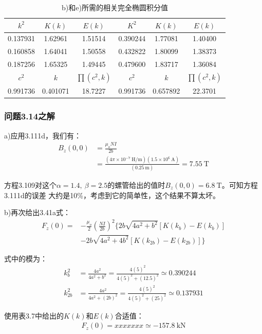 \begin{table}[htbp]\small
\centering
\caption{b)和e)所需的相关完全椭圆积分值}
	\begin{tabular}{|c|c|c||c|c|c|}
		\hline
	$	k^2   $   & $K(k)$     &$ E(k) $   &$ K^2  $   &$ K(k) $    &$ E(k) $   \\ \hline\hline
		0.137931 & 1.62961  & 1.51514 & 0.390244 & 1.77081  & 1.40400 \\ \hline
		0.160858 & 1.64041  & 1.50558 & 0.432822 & 1.80099  & 1.38373 \\ \hline
		0.187256 & 1.65325  & 1.49445 & 0.479600 & 1.83717  & 1.36084 \\ \hline\hline
		$c^2 $     &$ k  $     & $\prod(c^2,k) $& $c^2  $    & $k  $     &$ \prod(c^2,k)$       \\ \hline\hline
		0.991736 & 0.401071 & 18.7227 & 0.991736 & 0.657892 & 22.3701 \\ \hline
	\end{tabular}
\end{table}

\subsubsection{问题3.14之解}
a)应用3.111d，我们有：
\begin{align*}
B_{z}(0,0)&=\frac{\mu_{o}NI}{2b}\\%
&=\frac{(4\pi\times 10^{-7}\ \mathrm{H/m})(1.5\times 10^{6}\ \mathrm{A})}{(0.25\ \mathrm{m})}=7.55\ \mathrm{T}\tag{3.111d}
\end{align*}

方程3.109对这个$\alpha=1.4,\ \beta=2.5$的螺管给出的值时$B_z(0,0) = 6.8\ \mathrm{T}$。可知方程3.111d的误差
大约是10\%，考虑到它的简单性，这个结果不算太坏。

b)再次给出3.41a式：
\begin{align*}
F_{z}(0)=&-\frac{\mu_{o}}{2}(\frac{NI}{2b})^{2}\{2b\sqrt{4a^{2}+b^{2}}[K(k_{b})-E(k_{b})]\\
&-2b\sqrt{4a^{2}+4b^{2}}[K(k_{2b})-E(k_{2b})]\}\tag{3.41a}%
\end{align*}

式中的模为：
\begin{align*}
k_b^2&=\frac{4a^2}{4a^2+b^2}=\frac{4(5)^2}{4(5)^2+(12.5)^2}\simeq 0.390244\\
k_{2b}^2&=\frac{4a^2}{4a^2+(2b)^2}=\frac{4(5)^2}{4(5)^2+(25)^2}\simeq 0.137931
\end{align*}

使用表3.7中给出的$K(k)$和$E(k)$合适值：
\begin{align*}
F_z(0)= xxxxxxx \simeq -157.8\ \mathrm{kN}
\end{align*}

